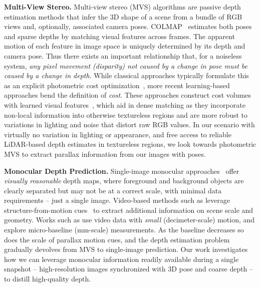 \vspace{0.5em}\noindent\textbf{Multi-View Stereo.}\hspace{0.1em}
Multi-view stereo (MVS) algorithms are passive depth estimation methods that infer the 3D shape of a scene from a bundle of RGB views and, optionally, associated camera poses. COLMAP~\cite{schonberger2016structure} estimates both poses and sparse depths by matching visual features across frames. The apparent motion of each feature in image space is uniquely determined by its depth and camera pose. Thus there exists an important relationship that, for a noiseless system, \emph{any pixel movement (disparity) not caused by a change in pose must be caused by a change in depth}. While classical approaches typically formulate this as an explicit photometric cost optimization~\cite{sinha2007multi,furukawa2009accurate,galliani2015massively}, more recent learning-based approaches bend the definition of \emph{cost}. These approaches construct  cost volumes with learned visual features~\cite{yao2018mvsnet,tankovich2021hitnet,lipson2021raft}, which aid in dense matching as they incorporate non-local information into otherwise textureless regions and are more robust to variations in lighting and noise that distort raw RGB values. In our scenario with virtually no variation in lighting or appearance, and free access to reliable LiDAR-based depth estimates in textureless regions, we look towards photometric MVS to extract parallax information from our images with poses.

\vspace{0.5em}\noindent\textbf{Monocular Depth Prediction.}\hspace{0.1em}
Single-image monocular approaches~\cite{ranftl2019towards,ranftl2021vision,godard2019digging} offer \emph{visually reasonable} depth maps, where foreground and background objects are clearly separated but may not be at a correct scale, with minimal data requirements -- just a single image.  Video-based methods such as \cite{fonder2021m4depth,luo2020consistent,watson2021temporal} leverage structure-from-motion cues~\cite{ullman1979interpretation} to extract additional information on scene scale and geometry. Works such as \cite{ha2016high,im2018accurate} use video data with \emph{small} (decimeter-scale) motion, and \cite{joshi2014micro,yu20143d} explore micro-baseline (mm-scale) measurements. As the baseline decreases so does the scale of parallax motion cues, and the depth estimation problem gradually devolves from MVS to single-image prediction. Our work investigates how we can leverage monocular information readily available during a single snapshot -- high-resolution images synchronized with 3D pose and coarse depth -- to distill high-quality depth.